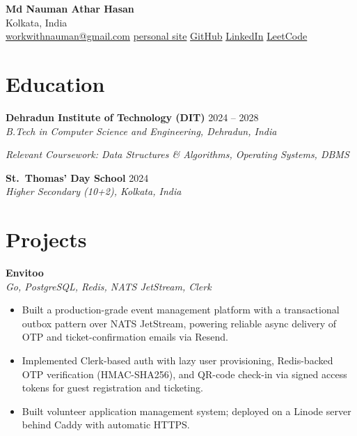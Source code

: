 \documentclass[11pt]{article}
\newcommand{\resumeheader}[3]{%
  \begin{center}
    {\LARGE\bfseries #1}\\[0.3em]
    #2 \\
    #3
  \end{center}
}
\begin{document}
\resumeheader
  {Md Nauman Athar Hasan}
  {Kolkata, India}
  {\href{mailto:workwithnauman@gmail.com}{workwithnauman@gmail.com} \textbar{} \href{https://link.mnah.dev}{personal site} \textbar{} \href{https://github.com/mnah05}{GitHub} \textbar{} \href{https://www.linkedin.com/in/nauman-hasan-53a66630a/}{LinkedIn} \textbar{} \href{https://leetcode.com/u/notagujju}{LeetCode}}

\section{Education}

\textbf{Dehradun Institute of Technology (DIT)} \hfill 2024 -- 2028\\
\textit{B.Tech in Computer Science and Engineering, Dehradun, India}

\textit{Relevant Coursework: Data Structures \& Algorithms, Operating Systems, DBMS}

\vspace{0.2em}

\textbf{St.\ Thomas' Day School} \hfill 2024\\
\textit{Higher Secondary (10+2), Kolkata, India}

\section{Projects}

\textbf{Envitoo}\\
\textit{Go, PostgreSQL, Redis, NATS JetStream, Clerk}
\begin{itemize}[nosep, leftmargin=1.5em]
  \item Built a production-grade event management platform with a transactional outbox pattern over NATS JetStream, powering reliable async delivery of OTP and ticket-confirmation emails via Resend.
  \item Implemented Clerk-based auth with lazy user provisioning, Redis-backed OTP verification (HMAC-SHA256), and QR-code check-in via signed access tokens for guest registration and ticketing.
  \item Built volunteer application management system; deployed on a Linode server behind Caddy with automatic HTTPS.
\end{itemize}

\vspace{0.35em}
\end{document}

